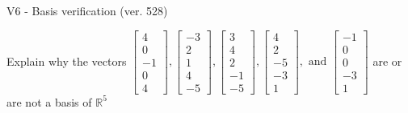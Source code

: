 \begin{exercise}
  \begin{exerciseTitle}V6 - Basis verification (ver. 528)\end{exerciseTitle}
  \begin{exerciseStatement}
    Explain why the vectors \(\left[\begin{array}{r}
4 \\
0 \\
-1 \\
0 \\
4
\end{array}\right] , \left[\begin{array}{r}
-3 \\
2 \\
1 \\
4 \\
-5
\end{array}\right] , \left[\begin{array}{r}
3 \\
4 \\
2 \\
-1 \\
-5
\end{array}\right] , \left[\begin{array}{r}
4 \\
2 \\
-5 \\
-3 \\
1
\end{array}\right] , \text{ and } \left[\begin{array}{r}
-1 \\
0 \\
0 \\
-3 \\
1
\end{array}\right]\) are or are not a basis of \(\mathbb{R}^5\)	



\end{exerciseStatement}
\end{exercise}

